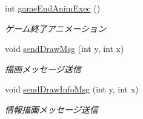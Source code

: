 \begin{DoxyCompactItemize}
int \hyperlink{class_reversi4color_form_1_1_reversi_play_a1f415a175312ca4d39d36685d3404311}{game\+End\+Anim\+Exec} ()
\begin{DoxyCompactList}\small\item\em ゲーム終了アニメーション \end{DoxyCompactList}\item 
void \hyperlink{class_reversi4color_form_1_1_reversi_play_ab6f979e1e361e6488e8bba9203b6a5b2}{send\+Draw\+Msg} (int y, int x)
\begin{DoxyCompactList}\small\item\em 描画メッセージ送信 \end{DoxyCompactList}\item 
void \hyperlink{class_reversi4color_form_1_1_reversi_play_a99633b55c8a3beff94a2726927fcef09}{send\+Draw\+Info\+Msg} (int y, int x)
\begin{DoxyCompactList}\small\item\em 情報描画メッセージ送信 \end{DoxyCompactList}\end{DoxyCompactItemize}
